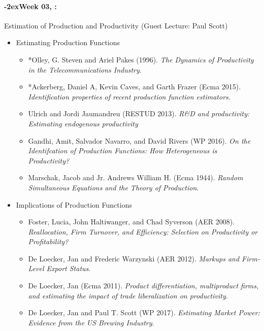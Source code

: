 \documentclass[11pt]{article}
\newcommand{\week}[1]{%
  \paragraph*{\kern-2ex\quad #1, \syldate{\today}:}%
  \ifdim\wd1=\wd\THURSDAY
    \AdvanceDate[7]
  \else
    \AdvanceDate[7]
  \fi%
}
\begin{document}
\week{Week 03} Estimation of Production and Productivity (Guest Lecture: Paul Scott)
\begin{itemize}
\item Estimating Production Functions
\begin{itemize}
\item *Olley, G. Steven and Ariel Pakes (1996). \textit{The Dynamics of Productivity in the Telecommunications Industry}.
\item  *Ackerberg, Daniel A, Kevin Caves, and Garth Frazer (Ecma 2015). \textit{Identification properties of recent production function estimators}.
\item Ulrich and Jordi Jaumandreu (RESTUD 2013). \textit{R\&D and productivity: Estimating endogenous productivity}
\item Gandhi, Amit, Salvador Navarro, and David Rivers (WP 2016). \textit{On the Identifcation of Production Functions: How Heterogeneous is Productivity?}
\item Marschak, Jacob and Jr. Andrews William H. (Ecma 1944). \textit{Random Simultaneous Equations and the Theory of Production}.
\end{itemize}
\item Implications of Production Functions
\begin{itemize}
\item Foster, Lucia, John Haltiwanger, and Chad Syverson (AER 2008). \textit{Reallocation, Firm Turnover, and Efficiency: Selection on Productivity or Profitability?}
\item De Loecker, Jan and Frederic Warzynski (AER 2012). \textit{Markups and Firm-Level Export Status}.
\item De Loecker, Jan (Ecma 2011). \textit{Product differentiation, multiproduct firms, and estimating the impact of trade liberalization on productivity}.
\item De Loecker, Jan and Paul T. Scott (WP 2017). \textit{Estimating Market Power: Evidence from the US Brewing Industry}.
\end{itemize}
\end{itemize}
\end{document}
